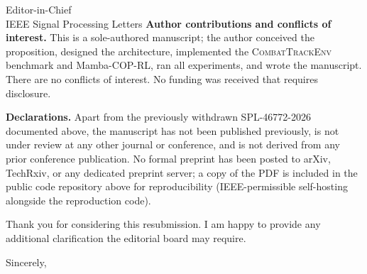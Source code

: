 \documentclass[11pt,a4paper]{letter}
\begin{document}
\begin{letter}{Editor-in-Chief\\
IEEE Signal Processing Letters}
\medskip
\textbf{Author contributions and conflicts of interest.}
This is a sole-authored manuscript; the author conceived the
proposition, designed the architecture, implemented the
\textsc{CombatTrackEnv} benchmark and Mamba-COP-RL, ran all experiments,
and wrote the manuscript. There are no conflicts of interest. No
funding was received that requires disclosure.

\medskip
\textbf{Declarations.}
Apart from the previously withdrawn SPL-46772-2026 documented above,
the manuscript has not been published previously, is not under review
at any other journal or conference, and is not derived from any prior
conference publication. No formal preprint has been posted to arXiv,
TechRxiv, or any dedicated preprint server; a copy of the PDF is
included in the public code repository above for reproducibility
(IEEE-permissible self-hosting alongside the reproduction code).

\medskip
Thank you for considering this resubmission. I am happy to provide any
additional clarification the editorial board may require.

\closing{Sincerely,}

\end{letter}
\end{document}
